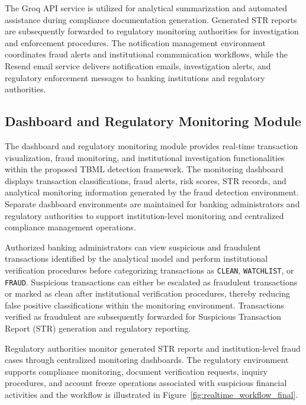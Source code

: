 The Groq API service is utilized for analytical summarization and automated assistance during compliance documentation generation. Generated STR reports are subsequently forwarded to regulatory monitoring authorities for investigation and enforcement procedures. The notification management environment coordinates fraud alerts and institutional communication workflows, while the Resend email service delivers notification emails, investigation alerts, and regulatory enforcement messages to banking institutions and regulatory authorities.
\subsection[Dashboard and Regulatory Monitoring Module]{\textbf{Dashboard and Regulatory Monitoring Module}}

The dashboard and regulatory monitoring module provides real-time transaction visualization, fraud monitoring, and institutional investigation functionalities within the proposed TBML detection framework. The monitoring dashboard displays transaction classifications, fraud alerts, risk scores, STR records, and analytical monitoring information generated by the fraud detection environment. Separate dashboard environments are maintained for banking administrators and regulatory authorities to support institution-level monitoring and centralized compliance management operations.

Authorized banking administrators can view suspicious and fraudulent transactions identified by the analytical model and perform institutional verification procedures before categorizing transactions as \texttt{CLEAN}, \texttt{WATCHLIST}, or \texttt{FRAUD}. Suspicious transactions can either be escalated as fraudulent transactions or marked as clean after institutional verification procedures, thereby reducing false positive classifications within the monitoring environment. Transactions verified as fraudulent are subsequently forwarded for Suspicious Transaction Report (STR) generation and regulatory reporting.

Regulatory authorities monitor generated STR reports and institution-level fraud cases through centralized monitoring dashboards. The regulatory environment supports compliance monitoring, document verification requests, inquiry procedures, and account freeze operations associated with suspicious financial activities and the workflow is illustrated in Figure~\ref{fig:realtime_workflow_final}.

